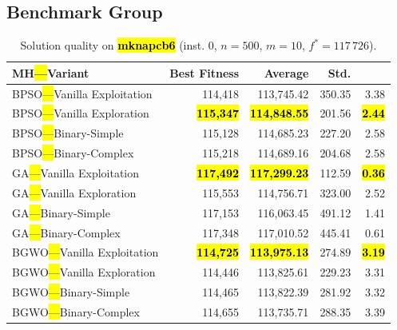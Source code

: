 \documentclass[mathematics,article,accept,moreauthors]{Definitions/mdpi}
\begin{document}
\subsection{Benchmark Group }

\vspace{-9pt}

\begin{table}[H]
  \small
  \caption{Solution quality on \textbf{\hl{mknapcb6}} (inst. 0, $n=500$, $m=10$, $f^*=117\,726$).}
  \label{tab:calidad_mknapcb6_0}
  \begin{tabularx}{\textwidth}{lRRRR}
    \toprule
    \textbf{MH\hl{---}Variant} &
    \textbf{Best Fitness} &
    \textbf{Average} &
    \textbf{Std.} &
    \textbf{} \\
    \midrule
    BPSO\hl{---}Vanilla Exploitation &         114,418 &        113,745.42 & 350.35 &         3.38 \\
    BPSO\hl{---}Vanilla Exploration  & \textbf{\hl{115,347}} & \textbf{\hl{114,848.55}} & 201.56 & \textbf{\hl{2.44}} \\
    BPSO\hl{---}Binary-Simple        &         115,128 &        114,685.23 & 227.20 &         2.58 \\
    BPSO\hl{---}Binary-Complex       &         115,218 &        114,689.16 & 204.68 &         2.58 \\
    \midrule
    GA\hl{---}Vanilla Exploitation   & \textbf{\hl{117,492}} & \textbf{\hl{117,299.23}} & 112.59 & \textbf{\hl{0.36}} \\
    GA\hl{---}Vanilla Exploration    &         115,553 &        114,756.71 & 323.00 &         2.52 \\
    GA\hl{---}Binary-Simple          &         117,153 &        116,063.45 & 491.12 &         1.41 \\
    GA\hl{---}Binary-Complex         &         117,348 &        117,010.52 & 445.41 &         0.61 \\
    \midrule
    BGWO\hl{---}Vanilla Exploitation & \textbf{\hl{114,725}} & \textbf{\hl{113,975.13}} & 274.89 & \textbf{\hl{3.19}} \\
    BGWO\hl{---}Vanilla Exploration  &         114,446 &        113,825.61 & 229.23 &         3.31 \\
    BGWO\hl{---}Binary-Simple        &         114,465 &        113,822.39 & 281.92 &         3.32 \\
    BGWO\hl{---}Binary-Complex       &         114,655 &        113,735.71 & 288.35 &         3.39 \\

\end{tabularx}
\end{table}
\end{document}
